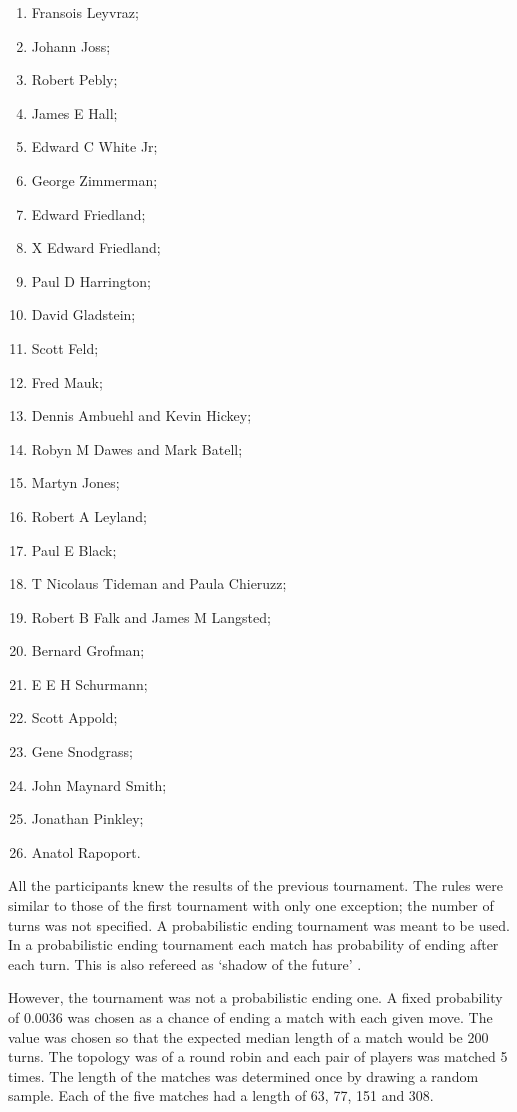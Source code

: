 \documentclass{article}
\begin{document}
\begin{multicols}{3}
\begin{enumerate}
        \item Fransois Leyvraz;
        \item Johann Joss;
        \item Robert Pebly;
        \item James E Hall;
        \item Edward C White Jr;
        \item George Zimmerman;
        \item Edward Friedland;
        \item X	Edward Friedland;
        \item Paul D Harrington;
        \item David Gladstein;
        \item Scott Feld;
        \item Fred Mauk;
        \item Dennis Ambuehl and Kevin Hickey;
        \item Robyn M Dawes and Mark Batell;
        \item Martyn Jones;
        \item Robert A Leyland;
        \item Paul E Black;
        \item T Nicolaus Tideman and Paula Chieruzz;
        \item Robert B Falk and James M Langsted;
        \item Bernard Grofman;
        \item E E H Schurmann;
        \item Scott Appold;
        \item Gene Snodgrass;
        \item John Maynard Smith;
        \item Jonathan Pinkley;
        \item Anatol Rapoport.
    \end{enumerate}
\end{multicols}

All the participants knew the results of the previous tournament. The rules 
were similar to those of the first tournament with only one exception;
the number of turns was not specified. A probabilistic ending tournament was
meant to be used. In a probabilistic ending tournament each match has probability 
of ending after each turn. This is  also refereed as `shadow of the future'
\cite{axelrod1988}. 

However, the tournament was not a probabilistic ending one. A fixed probability 
of  0.0036 was chosen as a chance of ending a match with each given move. The
value was chosen so that the expected median length of a match would be 200
turns. The topology was of a round robin and each pair of players was matched 
5 times. The length of the matches was determined once by drawing a random sample.
Each of the five matches had a length of 63, 77, 151 and 308.
\end{document}
